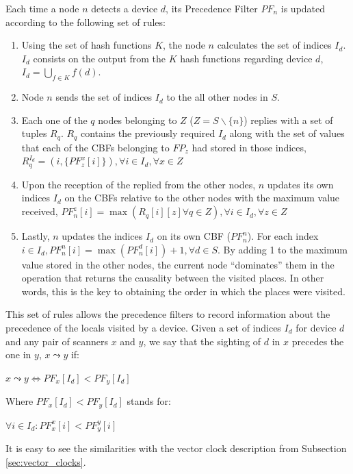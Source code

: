 Each time a node $n$ detects a device $d$, its Precedence Filter
$PF_n$ is updated according to the following set of rules:
\begin{enumerate}
\item Using the set of hash functions $K$, the node $n$ calculates the
  set of indices $I_d$. $I_d$ consists on the output from the $K$ hash
  functions regarding device $d$, $I_d=\bigcup_{f \in K} f(d)$.
\item Node $n$ sends the set of indices $I_d$ to the all other nodes
  in $S$.
\item Each one of the $q$ nodes belonging to $Z$ ($Z = S \backslash
  \{n\}$) replies with a set of tuples $R_q$. $R_q$ contains
  the previously required $I_d$ along with the set of values that each
  of the CBFs belonging to $FP_z$ had stored in those indices,
  $R_q^{I_d}= (i,\{PF_z^x[i]\}) ,\forall i \in I_d, \forall x \in Z$
\item Upon the reception of the replied from the other nodes, $n$
  updates its own indices $I_d$ on the CBFs relative to the other
  nodes with the maximum value received, $PF_n^z[i] = \max(R_q[i][z] \forall
  q \in Z), \forall i \in I_d, \forall z \in Z$
\item Lastly, $n$ updates the indices $I_d$ on its own CBF
  ($PF_n^n$). For each index $i \in I_d, PF_n^n[i] = \max(PF_n^d[i])+1,
  \forall d \in S$. By adding 1 to the maximum value stored in the
  other nodes, the current node ``dominates'' them in the operation
  that returns the causality between the visited places. In other
  words, this is the key to obtaining the order in which the places were
  visited.
\end{enumerate}

This set of rules allows the precedence filters to record information
about the precedence of the locals visited by a device. Given a set of
indices $I_d$ for device $d$ and any pair of scanners $x$ and $y$, we
say that the sighting of $d$ in $x$ precedes the one in $y$, $x
\leadsto y$ if:

\begin{center}
\begin{math}
	x\leadsto y \Longleftrightarrow PF_{x}[I_d] < PF_{y}[I_d]
\end{math}
\end{center}
Where $PF_x[I_d] < PF_y[I_d]$ stands for:
\begin{center}
  \begin{math}
    \forall i \in I_d : PF_x^x[i] < PF_y^y[i]
  \end{math}

\end{center}
It is easy to see the similarities with the vector clock description
from Subsection \ref{sec:vector_clocks}.


